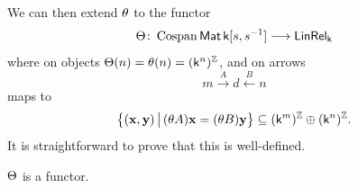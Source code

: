 
%
We can then extend $\theta$ to the functor
\[
  \Theta {\colon} \operatorname{{Cospan}}\operatorname{\mathsf{Mat}}{\mathsf{k}[s,s^{-1}]} \longrightarrow \operatorname{\mathsf{LinRel}}_{\mathsf{k}}
\]
where on objects $\Theta(n)=\theta(n)=(\mathsf{k}^n)^{\mathbb Z}$, and on arrows
\[
  m\xrightarrow{A} d \xleftarrow{B}n
\]
maps to
\begin{equation}\label{eq.K}
  \big\{(\mathbf{x},\mathbf{y}) \,\big|\,
  (\theta A)\mathbf{x} = (\theta B)\mathbf{y}\big\} 
  \subseteq (\mathsf{k}^m)^{\mathbb Z} \oplus (\mathsf{k}^n)^{\mathbb Z}.
\end{equation}
It is straightforward to prove that this is well-defined.
\begin{proposition}\label{prop.funct}
$\Theta$ is a functor.
\end{proposition}
